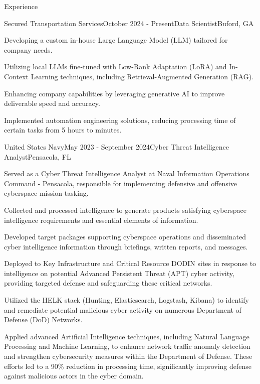 \documentclass[
	11pt, %
]{resume} %
\begin{document}
\begin{rSection}{Experience}
	\begin{rSubsection}{Secured Transportation Services}{October 2024 - Present}{Data Scientist}{Buford, GA}
        \item Developing a custom in-house Large Language Model (LLM) tailored for company needs.
        \item Utilizing local LLMs fine-tuned with Low-Rank Adaptation (LoRA) and In-Context Learning techniques, including Retrieval-Augmented Generation (RAG).
        \item Enhancing company capabilities by leveraging generative AI to improve deliverable speed and accuracy.
        \item Implemented automation engineering solutions, reducing processing time of certain tasks from 5 hours to minutes.

	\begin{rSubsection}{United States Navy}{May 2023 - September 2024}{Cyber Threat Intelligence Analyst}{Pensacola, FL}
		\item Served as a Cyber Threat Intelligence Analyst at Naval Information Operations Command - Pensacola, responsible for implementing defensive and offensive cyberspace mission tasking.
		\item Collected and processed intelligence to generate products satisfying cyberspace intelligence requirements and essential elements of information.
		\item Developed target packages supporting cyberspace operations and disseminated cyber intelligence information through briefings, written reports, and messages.
        \item Deployed to Key Infrastructure and Critical Resource DODIN sites in response to intelligence on potential Advanced Persistent Threat (APT) cyber activity, providing targeted defense and safeguarding these critical networks.
		\item Utilized the HELK stack (Hunting, Elasticsearch, Logstash, Kibana) to identify and remediate potential malicious cyber activity on numerous Department of Defense (DoD) Networks.
	    \item Applied advanced Artificial Intelligence techniques, including Natural Language Processing and Machine Learning, to enhance network traffic anomaly detection and strengthen cybersecurity measures within the Department of Defense. These efforts led to a 90\% reduction in processing time, significantly improving defense against malicious actors in the cyber domain.


\end{rSubsection}
\end{rSubsection}
\end{rSection}
\end{document}
